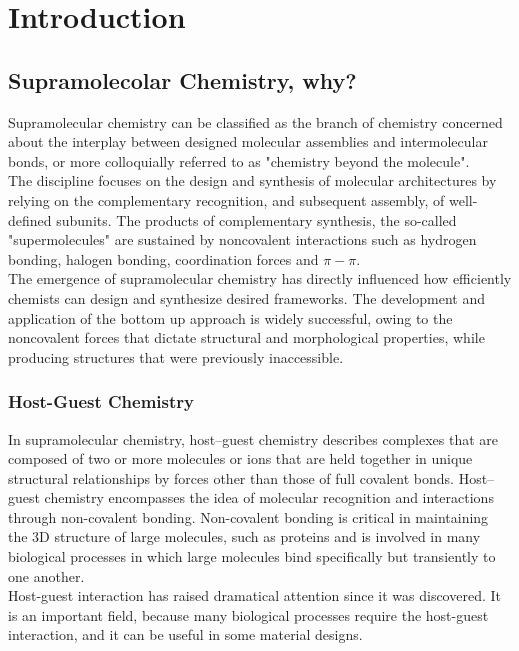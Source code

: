 \documentclass[../Master.tex]{subfiles}
\begin{document}
\chapter{Introduction}
\section{Supramolecolar Chemistry, why?}\label{sec:supramolecular-chemistry}
Supramolecular chemistry can be classified as the branch of chemistry concerned about the interplay between designed molecular assemblies and intermolecular bonds, or more colloquially referred to as "chemistry beyond the molecule". \\
The discipline focuses on the design and synthesis of molecular architectures by relying on the complementary recognition, and subsequent assembly, of well-defined subunits. The products of complementary synthesis, the so-called "supermolecules" are sustained by noncovalent interactions such as hydrogen bonding, halogen bonding, coordination forces and \(\pi-\pi\). \\
The emergence of supramolecular chemistry has directly influenced how efficiently chemists can design and synthesize desired frameworks. The development and application of the bottom up approach is widely successful, owing to the noncovalent forces that dictate structural and morphological properties, while producing structures that were previously inaccessible.

\subsection{Host-Guest Chemistry}\label{subsec:host-guest-chemistry}

In supramolecular chemistry, host–guest chemistry describes complexes that are composed of two or more molecules or ions that are held together in unique structural relationships by forces other than those of full covalent bonds. Host–guest chemistry encompasses the idea of molecular recognition and interactions through non-covalent bonding. Non-covalent bonding is critical in maintaining the 3D structure of large molecules, such as proteins and is involved in many biological processes in which large molecules bind specifically but transiently to one another.\\
Host-guest interaction has raised dramatical attention since it was discovered. It is an important field, because many biological processes require the host-guest interaction, and it can be useful in some material designs.
\end{document}
